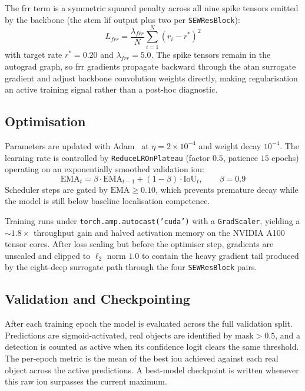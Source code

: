 The \gls{frr} term is a symmetric squared penalty across all nine spike tensors emitted by the backbone (the stem \gls{lif} output plus two per \texttt{SEWResBlock}):
\begin{equation}
    L_{frr} = \frac{\lambda_{frr}}{N} \sum_{i=1}^{N} (r_i - r^*)^2
    \label{eq:frr_loss}
\end{equation}
with target rate $r^* = 0.20$ and $\lambda_{frr} = 5.0$. The spike tensors remain in the autograd graph, so \gls{frr} gradients propagate backward through the \gls{atan} surrogate gradient and adjust backbone convolution weights directly, making regularisation an active training signal rather than a post-hoc diagnostic.

\subsection{Optimisation}
\label{subsec:training_optimisation}

Parameters are updated with Adam~\cite{kingma2017adam} at $\eta = 2 \times 10^{-4}$ and weight decay $10^{-4}$. The learning rate is controlled by \texttt{ReduceLROnPlateau} (factor $0.5$, patience $15$ epochs) operating on an exponentially smoothed validation \gls{iou}:
\begin{equation}
    \text{EMA}_t = \beta \cdot \text{EMA}_{t-1} + (1 - \beta) \cdot \text{IoU}_t, \qquad \beta = 0.9
    \label{eq:ema_iou}
\end{equation}
Scheduler steps are gated by $\text{EMA} \geq 0.10$, which prevents premature decay while the model is still below baseline localisation competence.

Training runs under \texttt{torch.amp.autocast('cuda')} with a \texttt{GradScaler}, yielding a $\sim 1.8 \times$ throughput gain and halved activation memory on the NVIDIA A100 tensor cores. After loss scaling but before the optimiser step, gradients are unscaled and clipped to $\ell_2$ norm $1.0$ to contain the heavy gradient tail produced by the eight-deep surrogate path through the four \texttt{SEWResBlock} pairs.

\subsection{Validation and Checkpointing}
\label{subsec:training_validation}

After each training epoch the model is evaluated across the full validation split. Predictions are sigmoid-activated, real objects are identified by $\text{mask} > 0.5$, and a detection is counted as active when its confidence logit clears the same threshold. The per-epoch metric is the mean of the best \gls{iou} achieved against each real object across the active predictions. A best-model checkpoint is written whenever this raw \gls{iou} surpasses the current maximum.

